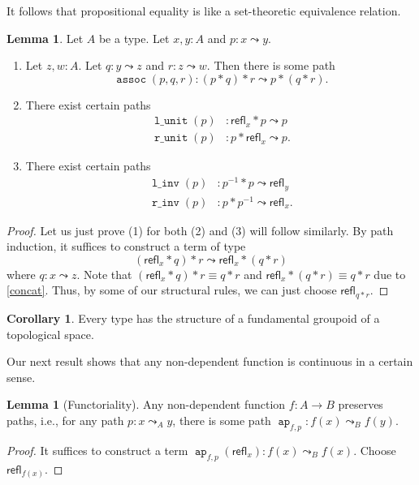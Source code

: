 \documentclass[10pt,letterpaper,cm]{nupset}
\theoremstyle{definition}
\theoremstyle{theorem}
\newtheorem{lemma}[definition]{Lemma}
\newtheorem{corollary}[definition]{Corollary}
\theoremstyle{remark}
\newcommand{\refl}{\mathsf{refl}}
\newcommand{\0}{\mathbf{0}}
\newcommand{\1}{\mathbf{1}}
\newcommand{\2}{\mathbf{2}}
\DeclareMathOperator{\assoc}{\mathtt{assoc}}
\DeclareMathOperator{\lunit}{\mathtt{l\_unit}}
\DeclareMathOperator{\runit}{\mathtt{r\_unit}}
\DeclareMathOperator{\linv}{\mathtt{l\_inv}}
\DeclareMathOperator{\rinv}{\mathtt{r\_inv}}
\DeclareMathOperator{\ap}{\mathtt{ap}}
\newcommand{\be}{\begin{enumerate}}
\newcommand{\ee}{\end{enumerate}}
\begin{document}
It follows that propositional equality is like a set-theoretic equivalence relation.

\begin{lemma} Let $A$ be a type. Let $x,y:A$ and  $p: x \leadsto y$.
\be[label=(\arabic*)]
\item Let $z, w : A$. Let  $q : y\leadsto z$ and $r : z \leadsto w$. Then there is some path $$ \assoc(p,q,r) : \left(p \ast q\right) \ast r \leadsto p \ast \left(q \ast r\right)    .$$
\item  There exist certain paths
\begin{align*}
\lunit(p) & : \refl_x \ast p \leadsto p
\\ \runit(p) &: p \ast \refl_x \leadsto p.
\end{align*}
\item There exist certain paths
\begin{align*}
\linv(p) & : p^{-1}\ast p \leadsto 	\refl_y
\\ \rinv(p) &: p \ast p^{-1} \leadsto \refl_x.
\end{align*}
\ee
\end{lemma}
\begin{proof}
Let us just prove (1) for both (2) and (3) will follow similarly. By path induction, it suffices to construct a term of type
\[
\left(\refl_x \ast q\right) \ast r \leadsto \refl_x \ast \left(q \ast r\right)
\] where $q: x \leadsto z$. Note that $\left(\refl_x \ast q\right) \ast r \equiv q \ast r$ and  $\refl_x \ast \left(q \ast r\right) \equiv q \ast r   $ due to \cref{concat}.   Thus, by some of our structural rules, we can just choose $\refl_{q\ast r}$.
\end{proof}

\begin{corollary}\label{groupoid} 
Every type has the structure of a fundamental groupoid of a topological space.
\end{corollary}

Our next result  shows that any non-dependent function is continuous in a certain sense.

\begin{lemma}[Functoriality] \label{functor}
Any non-dependent function $f: A \to B$ preserves paths, i.e., for any path $p: x \leadsto_A y$, there is some path $\ap_{f,p} : f(x) \leadsto_B f(y)$.
\end{lemma}
\begin{proof}
It suffices to construct a term $\ap_{f, p}(\refl_x) : f(x) \leadsto_B f(x)$. Choose $\refl_{f(x)}$.
\end{proof}
\end{document}
